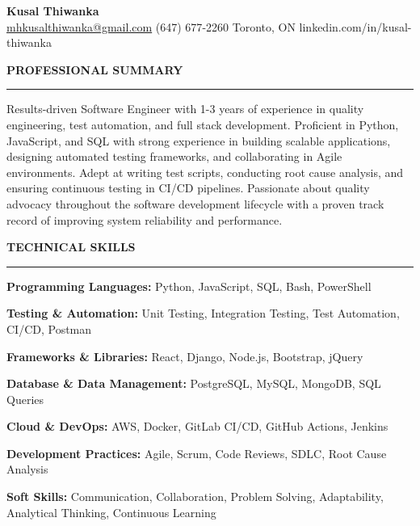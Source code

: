 \documentclass[10pt,letterpaper]{article}
\begin{document}
\begin{center}
{\LARGE\textbf{Kusal Thiwanka}}\\[3pt]
\href{mailto:mhkusalthiwanka@gmail.com}{mhkusalthiwanka@gmail.com}\hspace{2em}%
(647) 677{-}2260\hspace{2em}%
Toronto, ON\hspace{2em}
linkedin.com/in/kusal-thiwanka
\end{center}

\vspace{6pt}

\textbf{PROFESSIONAL SUMMARY}\\[-8pt]
\noindent\rule{\textwidth}{1pt}

\vspace{-2pt}

Results-driven Software Engineer with 1-3 years of experience in quality engineering, test automation, and full stack development. Proficient in Python, JavaScript, and SQL with strong experience in building scalable applications, designing automated testing frameworks, and collaborating in Agile environments. Adept at writing test scripts, conducting root cause analysis, and ensuring continuous testing in CI/CD pipelines. Passionate about quality advocacy throughout the software development lifecycle with a proven track record of improving system reliability and performance.

\vspace{8pt}

\textbf{TECHNICAL SKILLS}\\[-8pt]
\noindent\rule{\textwidth}{1pt}

\vspace{-2pt}

\textbf{Programming Languages:} Python, JavaScript, SQL, Bash, PowerShell

\textbf{Testing \& Automation:} Unit Testing, Integration Testing, Test Automation, CI/CD, Postman

\textbf{Frameworks \& Libraries:} React, Django, Node.js, Bootstrap, jQuery

\textbf{Database \& Data Management:} PostgreSQL, MySQL, MongoDB, SQL Queries

\textbf{Cloud \& DevOps:} AWS, Docker, GitLab CI/CD, GitHub Actions, Jenkins

\textbf{Development Practices:} Agile, Scrum, Code Reviews, SDLC, Root Cause Analysis

\textbf{Soft Skills:} Communication, Collaboration, Problem Solving, Adaptability, Analytical Thinking, Continuous Learning
\end{document}
